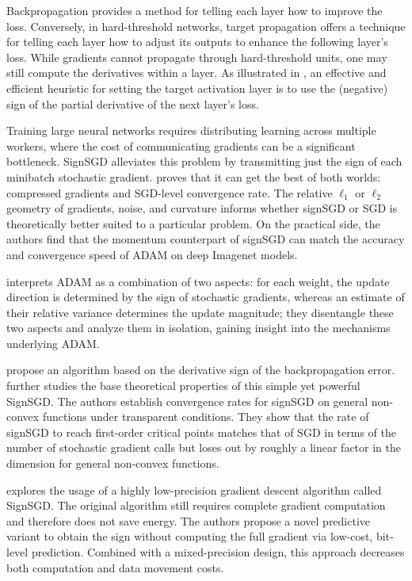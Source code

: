 \documentclass[11pt]{book}
\begin{document}
Backpropagation provides a method for telling each layer how to improve
the loss. Conversely, in hard-threshold networks, target propagation
offers a technique for telling each layer how to adjust its outputs
to enhance the following layer's loss. While gradients cannot propagate
through hard-threshold units, one may still compute the derivatives
within a layer. As illustrated in \cite{friesen2017deep}, an effective
and efficient heuristic for setting the target activation layer is
to use the (negative) sign of the partial derivative of the next layer's
loss.

Training large neural networks requires distributing learning across
multiple workers, where the cost of communicating gradients can be
a significant bottleneck. SignSGD alleviates this problem by transmitting
just the sign of each minibatch stochastic gradient. \cite{bernstein2018signsgd}
proves that it can get the best of both worlds: compressed gradients
and SGD-level convergence rate. The relative $\ell_{1}$ or $\ell_{2}$
geometry of gradients, noise, and curvature informs whether signSGD
or SGD is theoretically better suited to a particular problem. On
the practical side, the authors find that the momentum counterpart
of signSGD can match the accuracy and convergence speed of ADAM on
deep Imagenet models.

\cite{balles2018dissecting} interprets ADAM as a combination of two
aspects: for each weight, the update direction is determined by the
sign of stochastic gradients, whereas an estimate of their relative
variance determines the update magnitude; they disentangle these two
aspects and analyze them in isolation, gaining insight into the mechanisms
underlying ADAM. 

\cite{zhang2018sign} propose an algorithm based on the derivative
sign of the backpropagation error. \cite{bernstein2018convergence}
further studies the base theoretical properties of this simple yet
powerful SignSGD. The authors establish convergence rates for signSGD
on general non-convex functions under transparent conditions. They
show that the rate of signSGD to reach first-order critical points
matches that of SGD in terms of the number of stochastic gradient
calls but loses out by roughly a linear factor in the dimension for
general non-convex functions.

\cite{wang2019e2} explores the usage of a highly low-precision gradient
descent algorithm called SignSGD. The original algorithm still requires
complete gradient computation and therefore does not save energy.
The authors propose a novel \textquotedbl predictive\textquotedbl{}
variant to obtain the sign without computing the full gradient via
low-cost, bit-level prediction. Combined with a mixed-precision design,
this approach decreases both computation and data movement costs.
\end{document}
